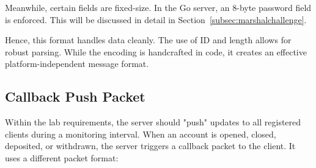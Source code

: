 \documentclass[9pt,a4paper]{article}
\begin{document}
Meanwhile, certain fields are fixed-size. In the Go server, an 8-byte password field is enforced. This will be discussed in detail in Section~\ref{subsec:marshalchallenge}.

Hence, this format handles data cleanly. The use of ID and length allows for robust parsing. While the encoding is handcrafted in code, it creates an effective platform-independent message format.

\subsection{Callback Push Packet}

Within the lab requirements, the server should "push" updates to all registered clients during a monitoring interval. When an account is opened, closed, deposited, or withdrawn, the server triggers a callback packet to the client. It uses a different packet format:
\end{document}
